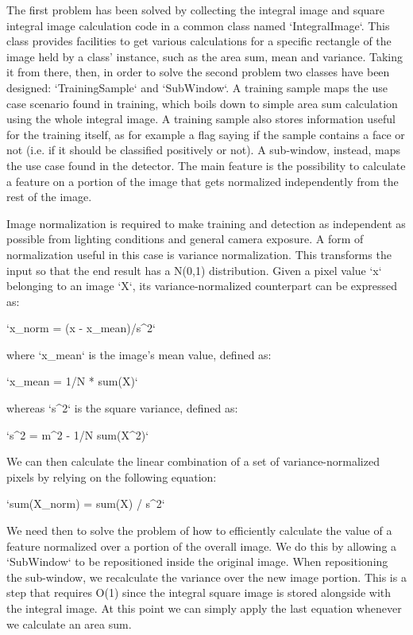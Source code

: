 \documentclass[a4paper,12pt,titlepage]{article}
\begin{document}
The first problem has been solved by collecting the integral image and square
integral image calculation code in a common class named `IntegralImage`. This
class provides facilities to get various calculations for a specific rectangle
of the image held by a class' instance, such as the area sum, mean and variance.
Taking it from there, then, in order to solve the second problem two classes
have been designed: `TrainingSample` and `SubWindow`. A training sample maps the
use case scenario found in training, which boils down to simple area sum
calculation using the whole integral image. A training sample also stores
information useful for the training itself, as for example a flag saying if the
sample contains a face or not (i.e. if it should be classified positively or
not). A sub-window, instead, maps the use case found in the detector. The main
feature is the possibility to calculate a feature on a portion of the image that
gets normalized independently from the rest of the image.

Image normalization is required to make training and detection as independent as
possible from lighting conditions and general camera exposure. A form of
normalization useful in this case is variance normalization. This transforms the
input so that the end result has a N(0,1) distribution.
Given a pixel value `x` belonging to an image `X`, its variance-normalized
counterpart can be expressed as:

`x_norm = (x - x_mean)/s^2`

where `x_mean` is the image's mean value, defined as:

`x_mean = 1/N * sum(X)`

whereas `s^2` is the square variance, defined as:

`s^2 = m^2 - 1/N sum(X^2)`

We can then calculate the linear combination of a set of variance-normalized
pixels by relying on the following equation:

`sum(X_norm) = sum(X) / s^2`

We need then to solve the problem of how to efficiently calculate the value of a
feature normalized over a portion of the overall image. We do this by allowing a
`SubWindow` to be repositioned inside the original image. When repositioning the
sub-window, we recalculate the variance over the new image portion. This is a
step that requires O(1) since the integral square image is stored alongside with
the integral image. At this point we can simply apply the last equation whenever
we calculate an area sum.
\end{document}
